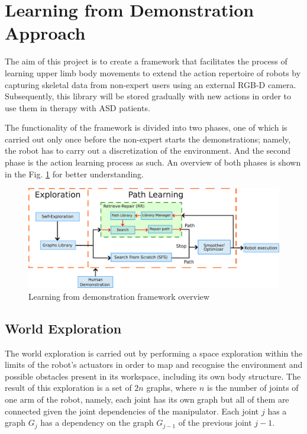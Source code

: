 \documentclass[thesis]{mas_proposal}
\begin{document}
\section{Learning from Demonstration Approach}

The aim of this project is to create a framework that facilitates the process of learning upper limb body movements to extend the action repertoire of robots by capturing skeletal data from non-expert users using an external RGB-D camera. Subsequently, this library will be stored gradually with new actions in order to use them in therapy with ASD patients.

The functionality of the framework is divided into two phases, one of which is carried out only once before the non-expert starts the demonstrations; namely, the robot has to carry out a discretization of the environment. And the second phase is the action learning process as such. An overview of both phases is shown in the Fig. \ref{fig:framework_overview} for better understanding.


\begin{figure}[h!]
	\includegraphics[width=\textwidth]{images/framework_overview.pdf}
	\caption{Learning from demonstration framework overview}
	\label{fig:framework_overview}
\end{figure}


\subsection{World Exploration}

The world exploration is carried out by performing a space exploration within the limits of the robot's actuators in order to map and recognise the environment and possible obstacles present in its workspace, including its own body structure. The result of this exploration is a set of $2n$ graphs, where $n$ is the number of joints of one arm of the robot, namely, each joint has its own graph but all of them are connected given the joint dependencies of the manipulator. Each joint $j$ has a graph $G_j$ has a dependency on the graph $G_{j-1}$ of the previous joint $j-1$. 
\end{document}
